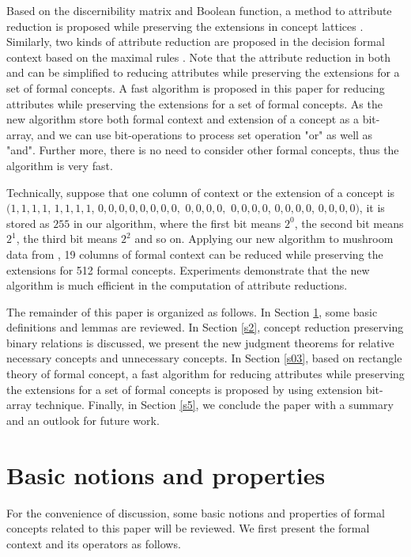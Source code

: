 \documentclass[11pt]{article}
\numberwithin{equation}{subsection}
\begin{document}
Based on the discernibility matrix and Boolean function, a method to attribute reduction is proposed while preserving the extensions
in concept lattices \cite{Zhang, Zhang05}.  Similarly,  two kinds of attribute reduction are proposed in the decision formal context based on the maximal rules \cite{Li}.
Note that the attribute reduction in both \cite{Zhang, Zhang05} and \cite{Li}  can be simplified to reducing attributes while preserving the extensions for a set of formal concepts. A fast algorithm is proposed in this paper for  reducing attributes while preserving the extensions for a set of  formal concepts.
As the new algorithm store both formal context and extension of a concept as a bit-array, and we can use bit-operations to process set operation "or" as well as "and". Further more, there is no need to consider other formal concepts, thus the algorithm is very fast.

Technically, suppose that one column of context or the extension of a concept is
$(1,1,1,1$, $1,1,1,1$, $0,0,0,0,0,0,0,0,$  $0,0,0,0,$  $0,0,0,0$,  $0,0,0,0$,   $0,0,0,0)$,  it is stored as $255$ in our algorithm, where the first bit means $2^0$, the second bit means $2^1$, the third bit means $2^2$ and so on. Applying our new  algorithm to mushroom data from \cite{Frank}, 19 columns of formal context  can be reduced while preserving the extensions for 512 formal concepts. Experiments demonstrate that the new algorithm is much efficient in the computation of attribute reductions.

The remainder of this paper is organized as follows. In Section \ref{s1}, some basic definitions and lemmas are reviewed. In Section \ref{s2}, concept reduction preserving binary relations is discussed, we present the new judgment theorems for relative necessary concepts and
unnecessary concepts. In Section \ref{s03}, based on rectangle theory of formal concept, a fast algorithm for  reducing attributes while preserving the extensions for a set of formal concepts is proposed by using extension bit-array technique.
Finally, in Section  \ref{s5}, we conclude the paper with a summary and an outlook for  future work.

\section{Basic notions and properties} \label{s1}

For the convenience of discussion,  some basic notions and properties of formal concepts related to this paper will be reviewed.
 We first present the formal context and its operators as follows.
\end{document}
